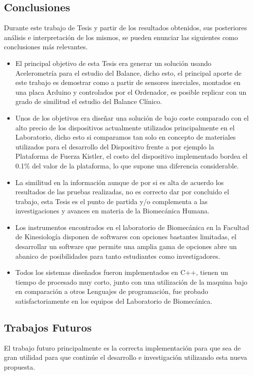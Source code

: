 \documentclass[12pt,a4paper]{article}
\begin{document}
\subsection{Conclusiones}
Durante este trabajo de Tesis y partir de los resultados obtenidos, sus posteriores análisis e interpretación de los mismos, se pueden enunciar las siguientes como conclusiones más relevantes.
\begin{itemize}
	\item El principal objetivo de esta Tesis era generar un solución usando Acelerometría para el estudio del Balance, dicho esto, el principal aporte de este trabajo es demostrar como a partir de sensores inerciales, montados en una placa Arduino y controlados por el Ordenador, es posible replicar con un grado de similitud el estudio del Balance Clínico.
	
	\item Unos de los objetivos era diseñar una solución de bajo coste comparado con el alto precio de los dispositivos actualmente utilizados principalmente en el Laboratorio, dicho esto si comparamos tan solo en concepto de materiales utilizados para el desarrollo del Dispositivo frente a por ejemplo la Plataforma de Fuerza Kistler, el costo del dispositivo implementado bordea el 0.1\% del valor de la plataforma, lo que supone una diferencia considerable.
			
	\item La similitud en la información aunque de por si es alta de acuerdo los resultados de las pruebas realizadas, no es correcto dar por concluido el trabajo, esta Tesis es el punto de partida y/o complementa a las investigaciones y avances en materia de la Biomecánica Humana.
	
	\item Los instrumentos encontrados en el laboratorio de Biomecánica en la Facultad de Kinesiología disponen de softwares con opciones bastantes limitadas, el desarrollar un software que permite una amplia gama de opciones abre un abanico de posibilidades para tanto estudiantes como investigadores.
	
	\item Todos los sistemas diseñados fueron implementados en C++, tienen un tiempo de procesado muy corto, junto con una utilización de la maquina bajo en comparación a otros Lenguajes de programación, fue probado satisfactoriamente en los equipos del Laboratorio de Biomecánica.
\end{itemize} 

\newpage
\subsection{Trabajos Futuros}
El trabajo futuro principalmente es la correcta implementación para que sea de gran utilidad para que continúe el desarrollo e investigación utilizando esta nueva propuesta.
\end{document}
